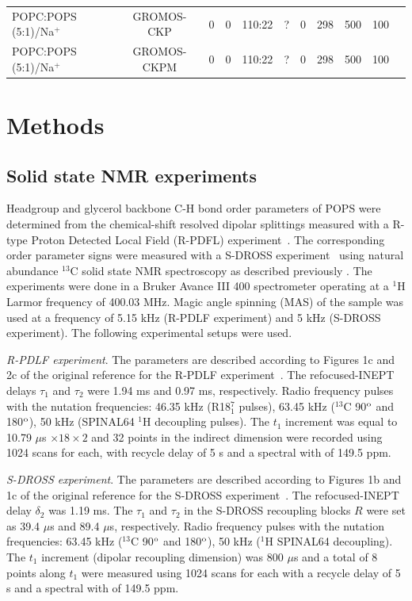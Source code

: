 \documentclass[aps,prl,superscriptaddress,twocolumn]{revtex4}
\begin{document}
\begin{table}[!p]
\begin{tabular}{l c c c c c c c c c c}
    \hline
    POPC:POPS (5:1)/Na$^+$  & GROMOS-CKP \cite{??}             &0    & 0     & 110:22 & ?     & 0  & 298  & 500 & 100 & \cite{POPCpopsGROMOSCKPwithNa}  \\
    POPC:POPS (5:1)/Na$^+$  & GROMOS-CKPM \cite{??}            &0    & 0     & 110:22 & ?     & 0  & 298  & 500 & 100 & \cite{POPCpopsGROMOSCKPMwithNa}  \\
\end{tabular}

 \end{table}

\section{Methods}

\subsection{Solid state NMR experiments}

Headgroup and glycerol backbone C-H bond order parameters of POPS
were determined from the chemical-shift resolved dipolar splittings
measured with a R-type Proton Detected Local Field (R-PDFL) experiment~\cite{dvinskikh04}.
The corresponding order parameter signs were measured with a S-DROSS experiment~\cite{gross97}
using natural abundance $^{13}$C solid state NMR spectroscopy as described previously \cite{ferreira13,ferreira16}.
The experiments were done in a Bruker Avance III 400 spectrometer operating at a $^1$H Larmor frequency of 400.03 MHz.
Magic angle spinning (MAS) of the sample was used at a frequency of 5.15 kHz (R-PDLF experiment) and 5 kHz (S-DROSS experiment).
The following experimental setups were used.

{\emph{R-PDLF experiment}}. The parameters are described according to Figures 1c and 2c of the original reference
for the R-PDLF experiment~\cite{dvinskikh04}.  The refocused-INEPT delays $\tau_1$ and $\tau_2$ were 1.94 ms and 0.97 ms, respectively.
Radio frequency pulses with the nutation frequencies: 46.35 kHz (R18$^7_1$ pulses), 63.45 kHz ($^{13}$C 90$^{\rm{o}}$ and 180$^{\rm{o}}$),
50 kHz (SPINAL64 $^1$H decoupling pulses). The $t_1$ increment was equal to 10.79 $\mu$s $\times18\times2$ and 32 points in the indirect
dimension were recorded using 1024 scans for each, with recycle delay of 5 s and a spectral with of 149.5 ppm.

\emph{S-DROSS experiment}. The parameters are described according to Figures 1b and 1c of the original reference for the S-DROSS
experiment~\cite{gross97}. The refocused-INEPT delay $\delta_2$ was 1.19 ms. The $\tau_1$ and $\tau_2$ in the S-DROSS recoupling
blocks $R$ were set as 39.4 $\mu$s and 89.4 $\mu$s, respectively. Radio frequency pulses with the nutation
frequencies: 63.45 kHz ($^{13}$C 90$^{\rm{o}}$ and 180$^{\rm{o}}$), 50 kHz ($^1$H SPINAL64 decoupling).
The $t_1$ increment (dipolar recoupling dimension) was 800 $\mu$s and a total of 8 points along $t_1$ were
measured using 1024 scans for each with a recycle delay of 5 s and a spectral with of 149.5 ppm.
\end{document}
